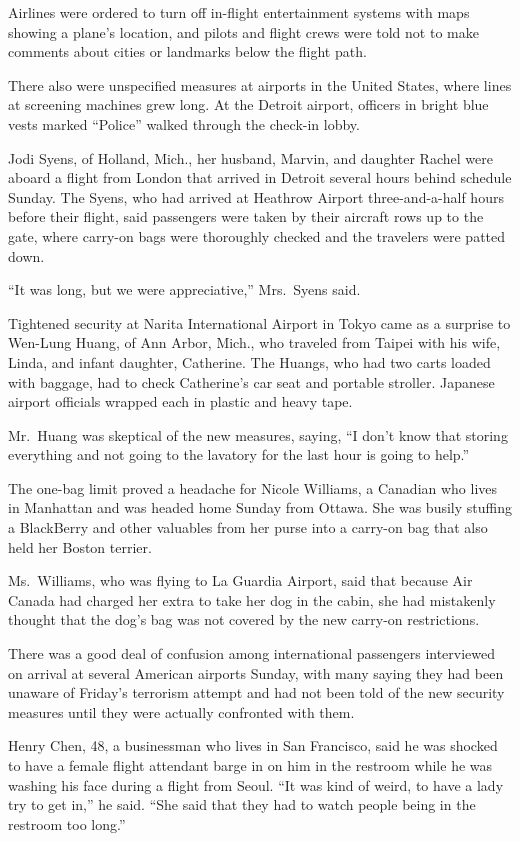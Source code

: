 ﻿\documentclass[12pt]{article}
\begin{document}
Airlines were ordered to turn off in-flight entertainment systems with maps showing a plane's
location, and pilots and flight crews were told not to make comments about cities or landmarks below
the flight path.

There also were unspecified measures at airports in the United States, where lines at screening
machines grew long. At the Detroit airport, officers in bright blue vests marked ``Police'' walked
through the check-in lobby.

Jodi Syens, of Holland, Mich., her husband, Marvin, and daughter Rachel were aboard a flight from
London that arrived in Detroit several hours behind schedule Sunday. The Syens, who had arrived at
Heathrow Airport three-and-a-half hours before their flight, said passengers were taken by their
aircraft rows up to the gate, where carry-on bags were thoroughly checked and the travelers were
patted down.

``It was long, but we were appreciative,'' Mrs.~Syens said.

Tightened security at Narita International Airport in Tokyo came as a surprise to Wen-Lung Huang, of
Ann Arbor, Mich., who traveled from Taipei with his wife, Linda, and infant daughter, Catherine. The
Huangs, who had two carts loaded with baggage, had to check Catherine's car seat and portable
stroller. Japanese airport officials wrapped each in plastic and heavy tape.

Mr.~Huang was skeptical of the new measures, saying, ``I don't know that storing everything and not
going to the lavatory for the last hour is going to help.''

The one-bag limit proved a headache for Nicole Williams, a Canadian who lives in Manhattan and was
headed home Sunday from Ottawa. She was busily stuffing a BlackBerry and other valuables from her
purse into a carry-on bag that also held her Boston terrier.

Ms.~Williams, who was flying to La Guardia Airport, said that because Air Canada had charged her
extra to take her dog in the cabin, she had mistakenly thought that the dog's bag was not covered by
the new carry-on restrictions.

There was a good deal of confusion among international passengers interviewed on arrival at several
American airports Sunday, with many saying they had been unaware of Friday's terrorism attempt and
had not been told of the new security measures until they were actually confronted with them.

Henry Chen, 48, a businessman who lives in San Francisco, said he was shocked to have a female
flight attendant barge in on him in the restroom while he was washing his face during a flight from
Seoul. ``It was kind of weird, to have a lady try to get in,'' he said. ``She said that they had to
watch people being in the restroom too long.''
\end{document}
